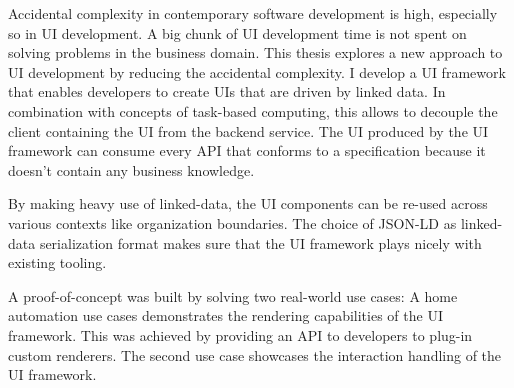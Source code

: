 Accidental complexity in contemporary software development is high, especially so in UI development. A big chunk of UI development time is not spent on solving problems in the business domain. This thesis explores a new approach to UI development by reducing the accidental complexity. I develop a UI framework that enables developers to create UIs that are driven by linked data. In combination with concepts of task-based computing, this allows to decouple the client containing the UI from the backend service. The UI produced by the UI framework can consume every API that conforms to a specification because it doesn't contain any business knowledge.

By making heavy use of linked-data, the UI components can be re-used across various contexts like organization boundaries. The choice of JSON-LD as linked-data serialization format makes sure that the UI framework plays nicely with existing tooling.

A proof-of-concept was built by solving two real-world use cases: A home automation use cases demonstrates the rendering capabilities of the UI framework. This was achieved by providing an API to developers to plug-in custom renderers. The second use case showcases the interaction handling of the UI framework.
